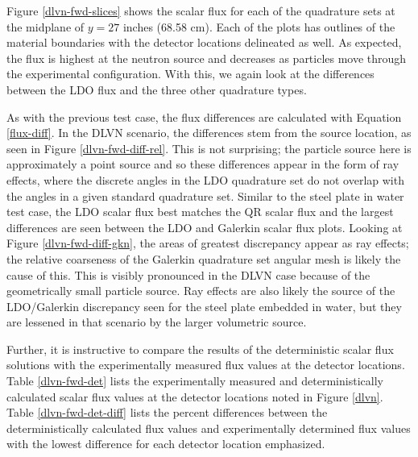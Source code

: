 \documentclass{article} %
\begin{document}
Figure \ref{dlvn-fwd-slices} shows the scalar flux for each of the
quadrature sets at the midplane of $y = 27$ inches (68.58 cm).
Each of the plots has outlines of the material boundaries with the detector
locations delineated as well. As expected, the flux is highest at the neutron
source and decreases as particles move through the experimental configuration.
With this, we again look at the differences between the LDO flux
and the three other quadrature types. 

As with the previous test case, the flux differences are calculated with
Equation \eqref{flux-diff}. In the DLVN scenario, the differences stem from
the source location, as seen in Figure \ref{dlvn-fwd-diff-rel}. This is not
surprising; the particle source here is approximately a point source and so
these differences appear in the form of ray effects, where the discrete angles
in the LDO quadrature set do not overlap with the angles in a given standard
quadrature set. Similar to the steel plate in water test case, the LDO scalar
flux best matches the QR scalar flux and the largest differences are seen
between the LDO and Galerkin scalar flux plots. Looking at Figure 
\ref{dlvn-fwd-diff-gkn}, the areas of greatest discrepancy appear as ray effects;
the relative coarseness of the Galerkin quadrature set angular mesh is likely the
cause of this. This is visibly pronounced in the DLVN case because of the
geometrically small particle source. Ray effects are also likely the source of
the  LDO/Galerkin discrepancy seen for the steel plate embedded in water, but
they are lessened in that scenario by the larger volumetric source.

Further, it is instructive to compare the results of the deterministic
scalar flux solutions with the experimentally measured flux values at the
detector locations. Table \ref{dlvn-fwd-det} lists the experimentally measured
\cite{dlvn1991} and deterministically calculated scalar flux values at the
detector locations noted in Figure \ref{dlvn}. Table \ref{dlvn-fwd-det-diff}
lists the percent differences between the deterministically calculated flux
values and experimentally determined flux values with the lowest difference
for each detector location emphasized.
\end{document}
